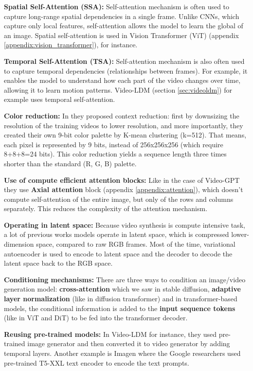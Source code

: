 \textbf{Spatial Self-Attention (SSA):} Self-attention mechanism is often used to capture long-range spatial dependencies in a single frame. Unlike CNNs, which capture only local features, self-attention allows the model to learn the global of an image. Spatial self-attention is used in Vision Transformer (ViT) \cite{vision_transformer} (appendix \ref{appendix:vision_transformer}), for instance.

\textbf{Temporal Self-Attention (TSA):} Self-attention mechanism is also often used to capture temporal dependencies (relationships between frames). For example, it enables the model to understand how each part of the video changes over time, allowing it to learn motion patterns. Video-LDM \cite{video_ldm} (section \ref{sec:videoldm}) for example uses temporal self-attention.

\textbf{Color reduction:} In \cite{imagegpt} they proposed context reduction: first by downsizing the resolution of the training videos to lower resolution, and more importantly, they created their own 9-bit color palette by K-mean clustering (k=512). That means, each pixel is represented by 9 bits, instead of 256x256x256 (which require 8+8+8=24 bits). This color reduction yields a sequence length three times shorter than the standard (R, G, B) palette.

\textbf{Use of compute efficient attention blocks:} Like in the case of Video-GPT they use \textbf{Axial attention} block (appendix \ref{appendix:attention}), which doesn't compute self-attention of the entire image, but only of the rows and columns separately. This reduces the complexity of the attention mechanism.

\textbf{Operating in latent space:} Because video synthesis is compute intensive task, a lot of previous works models operate in latent space, which is compressed lower-dimension space, compared to raw RGB frames. Most of the time, variational autoencoder is used to encode to latent space and the decoder to decode the latent space back to the RGB space.

\textbf{Conditioning mechanisms:} There are three ways to condition an image/video generation model: \textbf{cross-attention} which we saw in stable diffusion, \textbf{adaptive layer normalization} (like in diffusion transformer) and in transformer-based models, the conditional information is added to the \textbf{input sequence tokens} (like in ViT and DiT) to be fed into the transformer decoder.

\textbf{Reusing pre-trained models:} In Video-LDM for instance, they used pre-trained image generator and then converted it to video generator by adding temporal layers. Another example is Imagen where the Google researchers used pre-trained T5-XXL text encoder to encode the text prompts.
